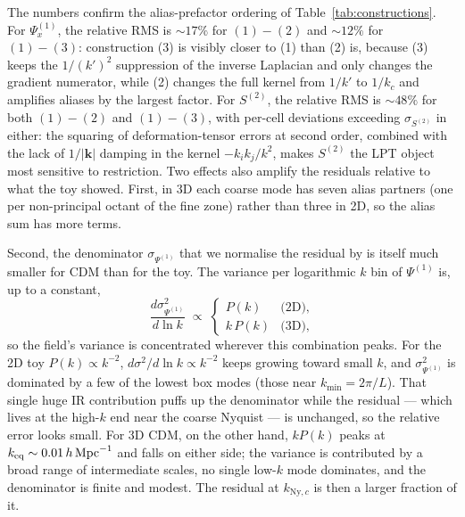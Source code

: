 \documentclass[12pt]{article}
\begin{document}
The numbers confirm the alias-prefactor ordering of
Table~\ref{tab:constructions}. For $\Psi_x^{(1)}$, the relative RMS is
$\sim 17\%$ for $(1)-(2)$ and $\sim 12\%$ for $(1)-(3)$: construction
(3) is visibly closer to (1) than (2) is, because (3) keeps the
$1/(k')^2$ suppression of the inverse Laplacian and only changes the
gradient numerator, while (2) changes the full kernel from $1/k'$ to
$1/k_c$ and amplifies aliases by the largest factor. For $S^{(2)}$,
the relative RMS is $\sim 48\%$ for both $(1)-(2)$ and $(1)-(3)$, with
per-cell deviations exceeding $\sigma_{S^{(2)}}$ in either: the
squaring of deformation-tensor errors at second order, combined with
the lack of $1/|\mathbf k|$ damping in the kernel $-k_ik_j/k^2$, makes
$S^{(2)}$ the LPT object most sensitive to restriction. Two effects also amplify the residuals relative to what the toy
showed. First, in 3D each coarse mode has
seven alias partners (one per non-principal octant of the fine zone)
rather than three in 2D, so the alias sum has more terms.

Second, the denominator $\sigma_{\Psi^{(1)}}$ that we normalise the
residual by is itself much smaller for CDM than for the toy. The
variance per logarithmic $k$ bin of $\Psi^{(1)}$ is, up to a constant,
\[
  \frac{d\sigma^2_{\Psi^{(1)}}}{d\ln k} \;\propto\;
  \begin{cases}
    P(k)            & \text{(2D)},\\[2pt]
    k\,P(k)         & \text{(3D)},
  \end{cases}
\]
so the field's variance is concentrated wherever this combination
peaks. For the 2D toy $P(k)\propto k^{-2}$, $d\sigma^2/d\ln k\propto
k^{-2}$ keeps growing toward small $k$, and $\sigma^2_{\Psi^{(1)}}$ is
dominated by a few of the lowest box modes (those near $k_{\min}=2\pi/L$).
That single huge IR contribution puffs up the denominator while the
residual --- which lives at the high-$k$ end near the coarse Nyquist
--- is unchanged, so the relative error looks small. For 3D CDM, on
the other hand, $kP(k)$ peaks at $k_{\rm eq}\sim 0.01\,h\,\text{Mpc}^{-1}$
and falls on either side; the variance is contributed by a broad
range of intermediate scales, no single low-$k$ mode dominates, and
the denominator is finite and modest. The residual at $k_{\mathrm{Ny},c}$
is then a larger fraction of it.
\end{document}
